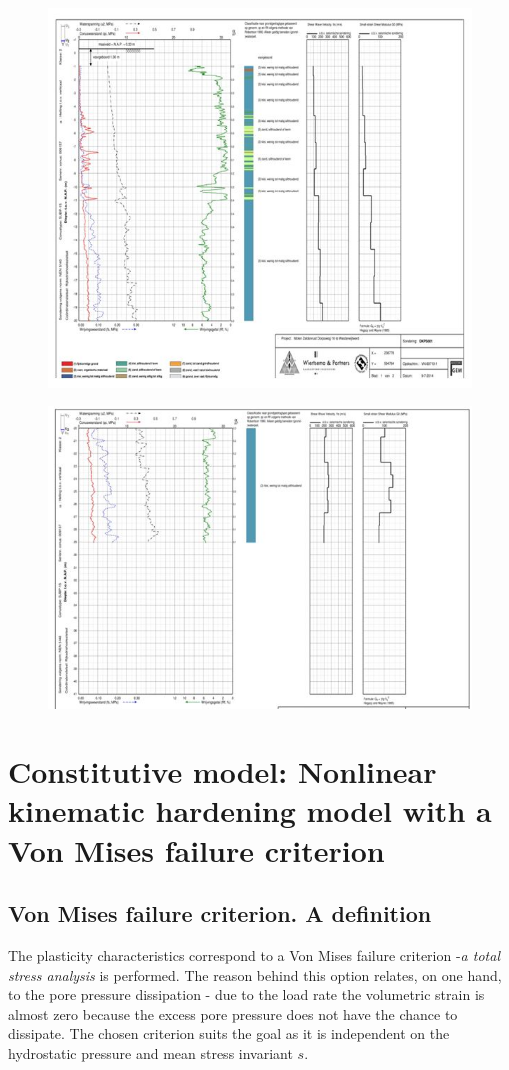 \documentclass[12pt,a4paper]{report}
\begin{document}
\begin{figure}[h!]
	\centering
	\includegraphics[width=0.85\linewidth]{"cpt"}
\end{figure}

\begin{figure}[h!]
	\centering
	\includegraphics[width=0.8\linewidth]{"cpt2"}
\end{figure}

\newpage
\chapter{Constitutive model: Nonlinear kinematic hardening model with a Von Mises failure criterion} \label{App:AppendixB}
\section{Von Mises failure criterion. A definition}
The plasticity characteristics correspond to a Von Mises failure criterion -\textit{a total stress analysis } is performed. The reason behind this option relates, on one hand, to the pore pressure dissipation - due to the load rate the volumetric strain is almost zero because the excess pore pressure does not have the chance to dissipate.  The chosen criterion suits the goal as it is independent on the hydrostatic pressure and mean stress invariant $s$.
\end{document}
